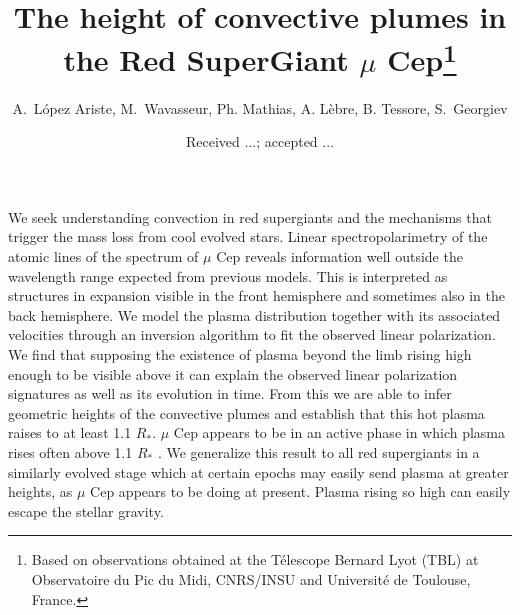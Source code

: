 \documentclass{/Users/art2/TeX/aanda/aa}
\begin{document}
 


   \title{The height of convective plumes in the Red SuperGiant $\mu$ Cep\thanks{Based on observations obtained at the T\'elescope Bernard Lyot
(TBL) at Observatoire du Pic du Midi, CNRS/INSU and Universit\'e de
Toulouse, France.}}

   \author{{ A.~L{\'o}pez Ariste},{ M.~Wavasseur}, { Ph. Mathias},  { A. L\`ebre}, { B. Tessore}, { S.~Georgiev}}
   \date{Received ...; accepted ...}

   

 
  \abstract
  {}
   {We seek understanding convection in red supergiants and  the mechanisms that trigger the mass loss from cool evolved stars.}
   {Linear spectropolarimetry of the atomic lines of the spectrum of $\mu$ Cep reveals information well outside the  wavelength range expected from previous models. This is interpreted as structures in expansion visible in the front hemisphere and sometimes also in the back hemisphere. We model the plasma distribution together with its associated velocities through an inversion algorithm to fit the observed linear polarization.
 }
   {We find that supposing the existence of plasma beyond the limb rising high enough to be visible above it can explain the observed linear polarization signatures as well as its evolution in time. From this we are able to infer geometric heights of the convective plumes and establish that this hot plasma raises to at least 1.1 $R_*$. }
   {$\mu$ Cep appears to be in an active phase in which plasma rises often above 1.1 $R_*$ . 
   We generalize this  result to all red supergiants in a similarly evolved stage which at certain epochs may easily send plasma at greater heights, as $\mu$ Cep appears to be doing at present. Plasma rising so high can easily escape the stellar gravity. }
  
\end{document}
